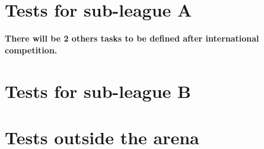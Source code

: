 \documentclass[11pt, twoside, openright, a4paper, chapterprefix]{scrbook}
\begin{document}

\pagestyle{empty}

% 
\clearpage

\pagestyle{empty}
\setcounter{tocdepth}{1}
\tableofcontents
\clearpage

\pagestyle{plain}









\chapter{Tests for sub-league A}
\label{chap:stage_A}


\textbf{There will be 2 others tasks to be defined after international competition.}

\clearpage





\chapter{Tests for sub-league B}
\label{chap:stage_B}

\clearpage                   






\chapter{Tests outside the arena}




\end{document}
